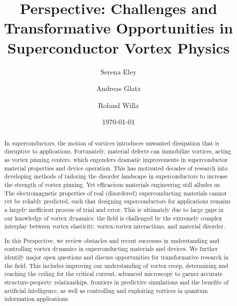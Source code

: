 \documentclass[%
 aip,
 amsmath,amssymb,
 reprint,%
floatfix]{revtex4-1}
\newcommand{\rw}[1]{{\color{myblue} #1~$_{\scriptscriptstyle{rw}}$ }}
\newcommand{\changerw}[2]{\st{#1} \rw{#2}}
\begin{document}

\title{Perspective: Challenges and Transformative Opportunities in Superconductor Vortex Physics}



\author{Serena Eley}


\author{Andreas Glatz}%


\author{Roland Willa}%
%
%
 


\date{\today}

%
\begin{abstract}

In superconductors, the motion of vortices introduces unwanted dissipation that is disruptive to applications. Fortunately, material defects can immobilize vortices, acting as vortex pinning centers, which engenders dramatic improvements in superconductor material properties and device operation. This has motivated decades of research into developing methods of tailoring the disorder landscape in superconductors to increase the strength of vortex pinning. Yet efficacious materials engineering still alludes us.  The electromagnetic properties of real (disordered) superconducting materials cannot yet be reliably predicted, such that designing superconductors for applications remains a largely inefficient process of trial and error. This is ultimately due to large gaps in our knowledge of vortex dynamics: the field is challenged by the extremely complex interplay between vortex elasticity, vortex-vortex interactions, and material disorder.  


In this Perspective, we review obstacles and recent successes in understanding and controlling vortex dynamics in superconducting materials and devices. We further identify major open questions and discuss opportunities for transformative research in the field.  This includes improving our understanding of vortex creep, determining and reaching the ceiling for the critical current, advanced microscopy to garner accurate structure-property relationships, frontiers in predictive simulations and the benefits of artificial intelligence, as well as controlling and exploiting vortices in quantum information applications.

\end{abstract}
\end{document}
